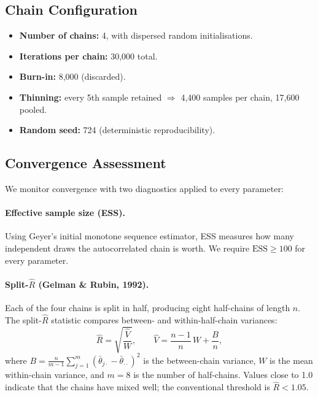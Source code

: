 \documentclass[11pt]{article}
\begin{document}
\subsection{Chain Configuration}

\begin{itemize}
  \item \textbf{Number of chains:} 4, with dispersed random initialisations.
  \item \textbf{Iterations per chain:} 30,000 total.
  \item \textbf{Burn-in:} 8,000 (discarded).
  \item \textbf{Thinning:} every 5th sample retained $\Rightarrow$ 4,400 samples per chain, 17,600 pooled.
  \item \textbf{Random seed:} 724 (deterministic reproducibility).
\end{itemize}

\subsection{Convergence Assessment}

We monitor convergence with two diagnostics applied to every parameter:

\paragraph{Effective sample size (ESS).}
Using Geyer's initial monotone sequence estimator, ESS measures how many
independent draws the autocorrelated chain is worth.  We require
$\text{ESS} \ge 100$ for every parameter.

\paragraph{Split-$\hat{R}$ (Gelman \& Rubin, 1992).}
Each of the four chains is split in half, producing eight half-chains of
length $n$.  The split-$\hat{R}$ statistic compares between- and
within-half-chain variances:
\begin{equation}\label{eq:split-rhat}
  \hat{R}
  = \sqrt{\frac{\hat{V}}{W}},
  \qquad
  \hat{V} = \frac{n-1}{n}\,W + \frac{B}{n},
\end{equation}
where
$B = \frac{n}{m-1}\sum_{j=1}^{m}(\bar{\theta}_{j\cdot} - \bar{\theta}_{\cdot\cdot})^2$
is the between-chain variance, $W$ is the mean within-chain variance, and
$m = 8$ is the number of half-chains.  Values close to 1.0 indicate that the
chains have mixed well; the conventional threshold is $\hat{R} < 1.05$.
\end{document}
